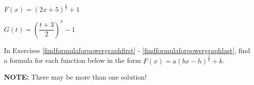 \documentclass{ximera}
\begin{document}
\begin{multicols}{2}

\begin{question} $F(x) =(2x+5)^{\frac{2}{3}}+1$  \end{question}
\begin{question} $G(t) = \left( \dfrac{t+3}{2}\right)^{\pi}-1$ \label{powergraphexlast} \end{question}

\end{multicols}


In Exercises \ref{findformulaforpowergraphfirst} - \ref{findformulaforpowergraphlast}, find a formula for each function below in the form $F(x) = a(bx-h)^{\frac{2}{3}}+k$.

\smallskip

\textbf{NOTE:}  There may be more than one solution!
\end{document}
